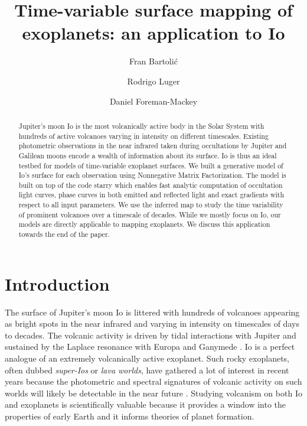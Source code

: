 \documentclass[modern]{aastex62}
\begin{document}
\title{Time-variable surface mapping of exoplanets: an application to Io}

\author{Fran Bartoli\'c}
\author{Rodrigo Luger}
\author{Daniel Foreman-Mackey}
%

\begin{abstract}
Jupiter's moon Io is the most volcanically active body in the Solar System with hundreds of active volcanoes varying in intensity on different timescales.
Existing photometric observations in the near infrared taken during occultations by Jupiter and Galilean moons encode a wealth of information about its surface.
Io is thus an ideal testbed for models of time-variable exoplanet surfaces.
We built a generative model of Io's surface for each observation using Nonnegative Matrix Factorization.
The model is built on top of the code starry \href{https://rodluger.github.io/starry/}{\color{linkcolor}\faGithub} which enables fast analytic computation of occultation light curves, phase curves in both emitted and reflected light and exact gradients with respect to all input parameters.
We use the inferred map to study the time variability of prominent volcanoes over a timescale of decades.
While we mostly focus on Io, our models are directly applicable to mapping exoplanets.
We discuss this application towards the end of the paper.\href{https://github.com/fbartolic/volcano}{\color{linkcolor}\faGithub}

\end{abstract}

%
\section{Introduction}
The surface of Jupiter's moon Io is littered with hundreds of volcanoes appearing as bright spots in the near infrared and varying in intensity on timescales of days to decades.
The volcanic activity is driven by tidal interactions with Jupiter and sustained by the Laplace resonance with Europa and Ganymede \citep{peale_melting_1979}.
Io is a perfect analogue of an extremely volcanically active exoplanet.
Such rocky exoplanets, often dubbed \emph{super-Ios} or \emph{lava worlds}, have gathered a lot of interest in recent years because the photometric and spectral signatures of volcanic activity on such worlds will likely be detectable in the near future \citep{kaltenegger_detecting_2010,henning_highly_2018,oza_sodium_2019}.
Studying volcanism on both Io and exoplanets is scientifically valuable because it provides a window into the properties of early Earth and it informs theories of planet formation.
\end{document}

